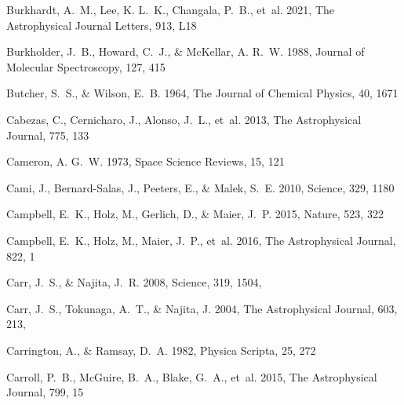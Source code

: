 \documentclass[twocolumn]{aastex631}
\begin{document}
\begin{thebibliography}{}
Burkhardt, A.~M., Lee, K. L.~K., Changala, P.~B., {et~al.} 2021, The
  Astrophysical Journal Letters, 913, L18

Burkholder, J.~B., Howard, C.~J., \& McKellar, A. R.~W. 1988, Journal of
  Molecular Spectroscopy, 127, 415

Butcher, S.~S., \& Wilson, E.~B. 1964, The Journal of Chemical Physics, 40,
  1671

Cabezas, C., Cernicharo, J., Alonso, J.~L., {et~al.} 2013, The Astrophysical
  Journal, 775, 133

Cameron, A. G.~W. 1973, Space Science Reviews, 15, 121

Cami, J., Bernard-Salas, J., Peeters, E., \& Malek, S.~E. 2010, Science, 329,
  1180

Campbell, E.~K., Holz, M., Gerlich, D., \& Maier, J.~P. 2015, Nature, 523, 322

Campbell, E.~K., Holz, M., Maier, J.~P., {et~al.} 2016, The Astrophysical
  Journal, 822, 1

{Carr}, J.~S., \& {Najita}, J.~R. 2008, Science, 319, 1504,

{Carr}, J.~S., {Tokunaga}, A.~T., \& {Najita}, J. 2004, The Astrophysical
  Journal, 603, 213, 

Carrington, A., \& Ramsay, D.~A. 1982, Physica Scripta, 25, 272

Carroll, P.~B., McGuire, B.~A., Blake, G.~A., {et~al.} 2015, The Astrophysical
  Journal, 799, 15


\end{thebibliography}
\end{document}
